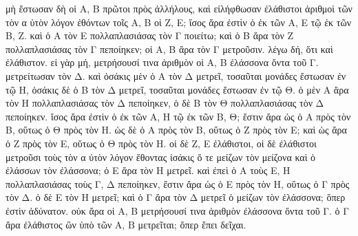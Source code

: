 \begin{Parallel}{}{}
{{\greekfont μὴ ἔστωσαν δὴ οἱ Α, Β πρῶτοι πρὸς ἀλλήλους, καὶ εἰλήφθωσαν
ἐλάθιστοι ἀριθμοὶ τῶν τὸν α ὐτὸν λόγον ἐθόντων τοῖς
Α, Β οἱ Ζ, Ε; ἴσος ἄρα ἐστὶν ὁ ἐκ τῶν Α, Ε τῷ ἐκ τῶν Β, Ζ.
καὶ ὁ Α τὸν Ε πολλαπλασιάσας τὸν Γ ποιείτω; καὶ ὁ Β ἄρα τὸν Ζ
πολλαπλασιάσας τὸν Γ πεποίηκεν; οἱ Α, Β ἄρα τὸν Γ μετροῦσιν.
λέγω δή, ὅτι καὶ ἐλάθιστον. εἰ γὰρ μή, μετρήσουσί τινα ἀριθμὸν
οἱ Α, Β ἐλάσσονα ὄντα τοῦ Γ. μετρείτωσαν τὸν Δ. καὶ ὁσάκις
μὲν ὁ Α τὸν Δ
μετρεῖ, τοσαῦται μονάδες ἔστωσαν
ἐν τῷ Η, ὁσάκις δὲ ὁ Β τὸν Δ μετρεῖ, τοσαῦται μονάδες ἔστωσαν
ἐν τῷ Θ. ὁ μὲν Α ἄρα τὸν Η πολλαπλασιάσας τὸν Δ πεποίηκεν,
ὁ δὲ Β τὸν Θ πολλαπλασιάσας τὸν Δ πεποίηκεν. ἴσος ἄρα ἐστὶν
ὁ ἐκ τῶν Α, Η τῷ ἐκ τῶν Β, Θ; ἔστιν ἄρα ὡς ὁ Α πρὸς τὸν
Β, οὕτως ὁ Θ πρὸς τὸν Η. ὡς δὲ ὁ Α πρὸς τὸν Β, οὕτως ὁ Ζ
πρὸς τὸν Ε; καὶ ὡς ἄρα ὁ Ζ πρὸς τὸν Ε, οὕτως ὁ Θ πρὸς
τὸν Η. οἱ δὲ Ζ, Ε ἐλάθιστοι, οἱ δὲ ἐλάθιστοι μετροῦσι τοὺς τὸν
α ὐτὸν λόγον ἔθοντας ἰσάκις ὅ τε μείζων τὸν μείζονα καὶ
ὁ ἐλάσσων τὸν ἐλάσσονα; ὁ Ε ἄρα τὸν Η μετρεῖ. καὶ ἐπεὶ
ὁ Α τοὺς Ε, Η πολλαπλασιάσας τοὺς Γ, Δ πεποίηκεν, ἔστιν ἄρα
ὡς ὁ Ε πρὸς τὸν Η, οὕτως ὁ Γ πρὸς τὸν Δ. ὁ δὲ Ε τὸν Η
μετρεῖ; καὶ ὁ Γ ἄρα τὸν Δ μετρεῖ ὁ μείζων τὸν ἐλάσσονα; ὅπερ
ἐστὶν ἀδύνατον. οὐκ ἄρα οἱ Α, Β μετρήσουσί τινα ἀριθμὸν
ἐλάσσονα ὄντα τοῦ Γ. ὁ Γ ἄρα ἐλάθιστος ὢν ὑπὸ
τῶν Α, Β μετρεῖται; ὅπερ ἔπει δεῖχαι.}}

\end{Parallel}
